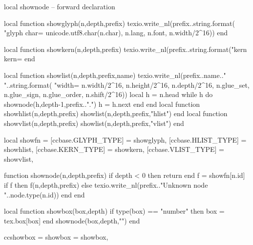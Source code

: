 
%
%
\luacode
local shownode -- forward declaration

local function showglyph(n,depth,prefix)
  texio.write_nl(prefix..string.format(
    "glyph char=%
    unicode.utf8.char(n.char),
    n.lang, n.font, n.width/2^16))
end

local function showkern(n,depth,prefix)
  texio.write_nl(prefix..string.format("kern kern=%
end

local function showlist(n,depth,prefix,name)
  texio.write_nl(prefix..name.." "..string.format(
    "width=%
    n.width/2^16, n.height/2^16, n.depth/2^16,
    n.glue_set, n.glue_sign, n.glue_order,
    n.shift/2^16))
  local h = n.head
  while h do
    shownode(h,depth-1,prefix..".")
    h = h.next
  end
end
local function showhlist(n,depth,prefix) showlist(n,depth,prefix,"hlist") end
local function showvlist(n,depth,prefix) showlist(n,depth,prefix,"vlist") end

local showfn = {
  [ccbase.GLYPH_TYPE] = showglyph,
  [ccbase.HLIST_TYPE] = showhlist,
  [ccbase.KERN_TYPE]  = showkern,
  [ccbase.VLIST_TYPE] = showvlist,
}

function shownode(n,depth,prefix)
  if depth < 0 then return end
  f = showfn[n.id]
  if f then
    f(n,depth,prefix)
  else
    texio.write_nl(prefix.."Unknown node "..node.type(n.id))
  end
end

local function showbox(box,depth)
  if type(box) == "number" then box = tex.box[box] end
  shownode(box,depth,"")
end

ccshowbox = {
  showbox = showbox,
}
\endluacode
\def\ccshowbox#1#2{\directlua{ccshowbox.showbox(#1,#2)}}
\endinput
